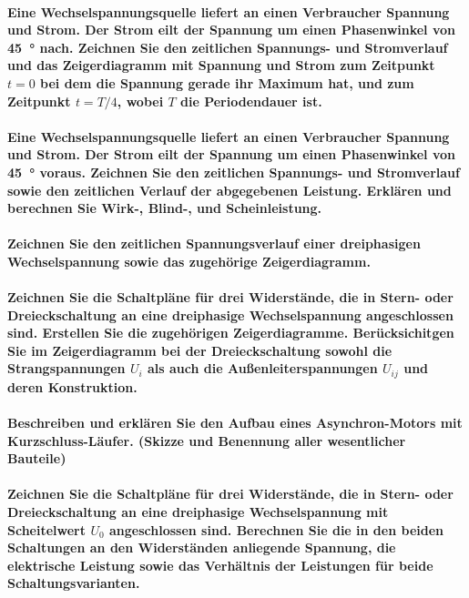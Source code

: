\documentclass[a4paper, 11pt, parskip=half]{scrartcl}
\begin{document}
\paragraph{Eine Wechselspannungsquelle liefert an einen Verbraucher Spannung und Strom. Der Strom
eilt der Spannung um einen Phasenwinkel von \SI{45}{\degree} nach. Zeichnen Sie den zeitlichen
Spannungs- und Stromverlauf und das Zeigerdiagramm mit Spannung und Strom zum Zeitpunkt $t=0$ bei
dem die Spannung gerade ihr Maximum hat, und zum Zeitpunkt $t=T/4$, wobei $T$ die Periodendauer
ist.}

\paragraph{Eine Wechselspannungsquelle liefert an einen Verbraucher Spannung und Strom. Der Strom
eilt der Spannung um einen Phasenwinkel von \SI{45}{\degree} voraus. Zeichnen Sie den zeitlichen
Spannungs- und Stromverlauf sowie den zeitlichen Verlauf der abgegebenen Leistung. Erklären und
berechnen Sie Wirk-, Blind-, und Scheinleistung.}

\paragraph{Zeichnen Sie den zeitlichen Spannungsverlauf einer dreiphasigen Wechselspannung sowie das
zugehörige Zeigerdiagramm.}

\paragraph{Zeichnen Sie die Schaltpläne für drei Widerstände, die in Stern- oder Dreieckschaltung an
eine dreiphasige Wechselspannung angeschlossen sind. Erstellen Sie die zugehörigen Zeigerdiagramme.
Berücksichitgen Sie im Zeigerdiagramm bei der Dreieckschaltung sowohl die Strangspannungen $U_i$ als
auch die Außenleiterspannungen $U_{ij}$ und deren Konstruktion.}

\paragraph{Beschreiben und erklären Sie den Aufbau eines Asynchron-Motors mit Kurzschluss-Läufer.
(Skizze und Benennung aller wesentlicher Bauteile)}

\paragraph{Zeichnen Sie die Schaltpläne für drei Widerstände, die in Stern- oder Dreieckschaltung an
eine dreiphasige Wechselspannung mit Scheitelwert $U_0$ angeschlossen sind. Berechnen Sie die in den
beiden Schaltungen an den Widerständen anliegende Spannung, die elektrische Leistung sowie das
Verhältnis der Leistungen für beide Schaltungsvarianten.}
\end{document}

